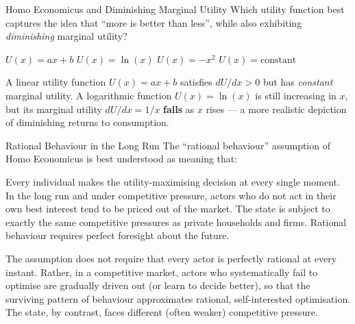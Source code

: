 \begin{question}[type=mc]{Homo Economicus and Diminishing Marginal Utility}
Which utility function best captures the idea that ``more is better than
less'', while also exhibiting \emph{diminishing} marginal utility?
\begin{choices}
  \choice        $U(x) = ax + b$
  \correctchoice $U(x) = \ln(x)$
  \choice        $U(x) = -x^2$
  \choice        $U(x) = \text{constant}$
\end{choices}
\begin{solution}
  A linear utility function $U(x) = ax+b$ satisfies $dU/dx > 0$ but has
  \emph{constant} marginal utility. A logarithmic function $U(x) = \ln(x)$
  is still increasing in $x$, but its marginal utility $dU/dx = 1/x$
  \textbf{falls} as $x$ rises — a more realistic depiction of diminishing
  returns to consumption.
\end{solution}
\end{question}

\begin{question}[type=mc]{Rational Behaviour in the Long Run}
The ``rational behaviour'' assumption of Homo Economicus is best understood
as meaning that:
\begin{choices}
  \choice        Every individual makes the utility-maximising decision at
                 every single moment.
  \correctchoice In the long run and under competitive pressure, actors who
                 do not act in their own best interest tend to be priced out
                 of the market.
  \choice        The state is subject to exactly the same competitive
                 pressures as private households and firms.
  \choice        Rational behaviour requires perfect foresight about the
                 future.
\end{choices}
\begin{solution}
  The assumption does not require that every actor is perfectly rational at
  every instant. Rather, in a competitive market, actors who systematically
  fail to optimise are gradually driven out (or learn to decide better),
  so that the surviving pattern of behaviour approximates rational,
  self-interested optimisation. The state, by contrast, faces different
  (often weaker) competitive pressure.
\end{solution}
\end{question}

